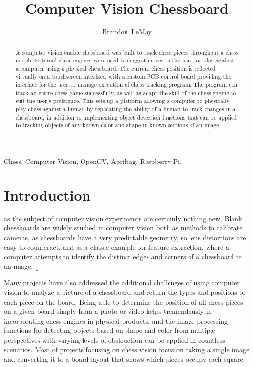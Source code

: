 \documentclass[journal]{IEEEtran}
\begin{document}
\title{Computer Vision Chessboard}

\author{Brandon~LeMay}

\maketitle

\begin{abstract}
A computer vision enable chessboard was built to track chess pieces throughout a chess match. External chess engines were used to suggest moves to the user, or play against a computer using a physical chessboard. The current chess position is reflected virtually on a touchscreen interface, with a custom PCB control board providing the interface for the user to manage execution of chess tracking program. The program can track an entire chess game successfully, as well as adapt the skill of the chess engine to suit the user's preference. This sets up a platform allowing a computer to physically play chess against a human by replicating the ability of a human to track changes in a chessboard, in addition to implementing object detection functions that can be applied to tracking objects of any known color and shape in known sections of an image.
\end{abstract}

\begin{IEEEkeywords}
Chess, Computer Vision, OpenCV, Apriltag, Raspberry Pi.
\end{IEEEkeywords}


\section{Introduction}
 as the subject of computer vision experiments are certainly nothing new. Blank chessboards are widely studied in computer vision both as methods to calibrate cameras, as chessboards have a very predictable geometry, so lens distortions are easy to counteract, and as a classic example for feature extraction, where a computer attempts to identify the distinct edges and corners of a chessboard in an image. [\cite{Forsyth2002}]

Many projects have also addressed the additional challenges of using computer vision to analyze a picture of a chessboard and return the types and positions of each piece on the board. Being able to determine the position of all chess pieces on a given board simply from a photo or video helps tremendously in incorporating chess engines in physical products, and the image processing functions for detecting objects based on shape and color from multiple perspectives with varying levels of obstruction can be applied in countless scenarios. Most of projects focusing on chess vision focus on taking a single image and converting it to a board layout that shows which pieces occupy each square.
\end{document}
